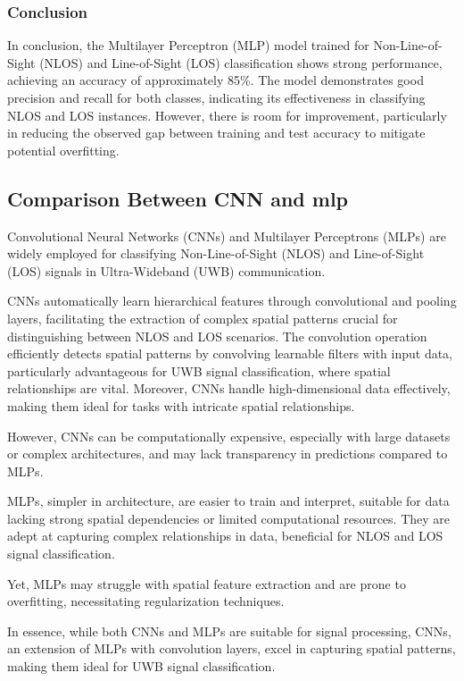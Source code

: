 \subsubsection{Conclusion}

In conclusion, the Multilayer Perceptron (MLP) model trained for Non-Line-of-Sight (NLOS) and Line-of-Sight (LOS) classification shows strong performance, achieving an accuracy of approximately 85\%. The model demonstrates good precision and recall for both classes, indicating its effectiveness in classifying NLOS and LOS instances. However, there is room for improvement, particularly in reducing the observed gap between training and test accuracy to mitigate potential overfitting.

\subsection{Comparison Between CNN and \acrshort{mlp}}\label{cnn_vs_mlp}
Convolutional Neural Networks (CNNs) and Multilayer Perceptrons (MLPs) are widely employed for classifying Non-Line-of-Sight (NLOS) and Line-of-Sight (LOS) signals in Ultra-Wideband (UWB) communication.

CNNs automatically learn hierarchical features through convolutional and pooling layers, facilitating the extraction of complex spatial patterns crucial for distinguishing between NLOS and LOS scenarios. The convolution operation efficiently detects spatial patterns by convolving learnable filters with input data, particularly advantageous for UWB signal classification, where spatial relationships are vital. Moreover, CNNs handle high-dimensional data effectively, making them ideal for tasks with intricate spatial relationships.

However, CNNs can be computationally expensive, especially with large datasets or complex architectures, and may lack transparency in predictions compared to MLPs.

MLPs, simpler in architecture, are easier to train and interpret, suitable for data lacking strong spatial dependencies or limited computational resources. They are adept at capturing complex relationships in data, beneficial for NLOS and LOS signal classification.

Yet, MLPs may struggle with spatial feature extraction and are prone to overfitting, necessitating regularization techniques.

In essence, while both CNNs and MLPs are suitable for signal processing, CNNs, an extension of MLPs with convolution layers, excel in capturing spatial patterns, making them ideal for UWB signal classification.


